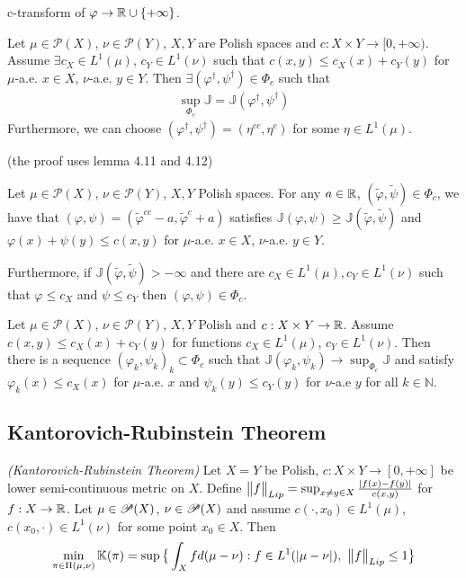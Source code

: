 \documentclass[10pt,a4paper]{article}
\begin{document}
 c-transform of $\varphi\rightarrow \mathbb{R}\cup\{+\infty\}$.
\s

 Let $\mu \in \mathscr{P}(X)$, $\nu\in \mathscr{P}(Y)$, $X,Y$ are Polish spaces and $c: X\times Y\rightarrow [0, +\infty)$. Assume $\exists c_X \in L^1(\mu)$, $c_Y \in L^1(\nu)$ such that $c(x,y) \leq c_X(x) + c_Y(y)$ for $\mu$-a.e. $x\in X$, $\nu$-a.e. $y\in Y$. Then $\exists (\varphi^{\dagger}, \psi^{\dagger}) \in \Phi_c$ such that
\begin{align*}
\sup_{\Phi_c} \mathbb{J}= \mathbb{J}(\varphi^{\dagger}, \psi^{\dagger})
\end{align*}
Furthermore, we can choose $(\varphi^{\dagger},\psi^{\dagger}) = (\eta^{cc}, \eta^c)$ for some $\eta \in L^1(\mu)$.

(the proof uses lemma 4.11 and 4.12)
\s

 Let $\mu \in \mathscr{P}(X)$, $\nu \in \mathscr{P}(Y)$, $X, Y$ Polish spaces. For any $a\in \mathbb{R}$, $(\tilde{\varphi}, \tilde{\psi}) \in \Phi_c$, we have that $(\varphi, \psi) = (\tilde{\varphi}^{cc} - a, \tilde{\varphi}^c + a)$ satisfies $\mathbb{J}(\varphi, \psi) \geq \mathbb{J}(\tilde{\varphi}, \tilde{\psi})$ and $\varphi(x) + \psi(y) \leq c(x,y)$ for $\mu$-a.e. $x\in X$, $\nu$-a.e. $y\in Y$.

\quad Furthermore, if $\mathbb{J}(\tilde{\varphi}, \tilde{\psi}) > -\infty$ and there are $c_X\in L^1(\mu), c_Y \in L^1(\nu)$ such that $\varphi \leq c_X$ and $\psi \leq c_Y$ then $(\varphi, \psi) \in \Phi_c$.
\s

 Let $\mu \in \mathscr{P}(X)$, $\nu\in \mathscr{P}(Y)$, $X,Y$ Polish and $c: X\times Y \rightarrow \mathbb{R}$. Assume $c(x,y) \leq c_X(x) + c_Y(y)$ for functions $c_X\in L^1(\mu) $, $c_Y\in L^1(\nu)$. Then there is a sequence $(\varphi_k, \psi_k)_k \subset \Phi_c$ such that $\mathbb{J}(\varphi_k, \psi_k) \rightarrow \sup_{\Phi_c} \mathbb{J}$ and satisfy $\varphi_k(x) \leq c_X(x)$ for $\mu$-a.e. $x$ and $\psi_k(y) \leq c_Y(y)$ for $\nu$-a.e $y$ for all $k\in \mathbb{N}$.
\s

\subsection{Kantorovich-Rubinstein Theorem}

 \emph{(Kantorovich-Rubinstein Theorem)} Let $X= Y$ be Polish, $c: X\times Y \rightarrow [0, + \infty]$ be lower semi-continuous metric on $X$. Define $\bigl\lVert f\bigr\rVert_{Lip}= \sup_{x\neq y\in X} \frac{|f(x) - f(y)|}{c(x,y)}$ for $f: X\rightarrow \mathbb{R}$. Let $\mu \in \mathscr{P}(X)$, $\nu \in \mathscr{P}(X)$ and assume $c(\cdot, x_0) \in L^1(\mu)$, $c(x_0, \cdot) \in L^1(\nu)$ for some point $x_0 \in X$. Then
\begin{align*}
\min_{\pi \in \Pi(\mu, \nu)}\mathbb{K}(\pi) = \sup \big\{ \int_X f d(\mu - \nu) : f\in L^1(|\mu - \nu|), \,\, \bigl\lVert f\bigr\rVert_{Lip} \leq 1\big\}
\end{align*}
\end{document}
